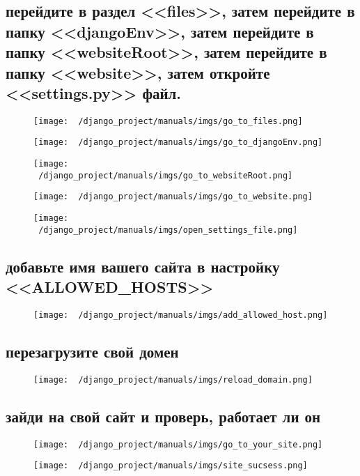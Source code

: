 \documentclass[12pt]{article}
\begin{document}
  \subsection{перейдите в раздел <<files>>, затем перейдите в папку <<djangoEnv>>, затем перейдите в папку <<websiteRoot>>, затем перейдите в папку <<website>>, затем откройте <<settings.py>> файл.}
	\begin{figure}[H]
		\centering
		\texttt{[image: ~/django\_project/manuals/imgs/go\_to\_files.png]}
		\caption{}
	\end{figure}
	\begin{figure}[H]
		\centering
		\texttt{[image: ~/django\_project/manuals/imgs/go\_to\_djangoEnv.png]}
		\caption{}
	\end{figure}
	\begin{figure}[H]
		\centering
		\texttt{[image: ~/django\_project/manuals/imgs/go\_to\_websiteRoot.png]}
		\caption{}
	\end{figure}
	\begin{figure}[H]
		\centering
		\texttt{[image: ~/django\_project/manuals/imgs/go\_to\_website.png]}
		\caption{}
	\end{figure}
	\begin{figure}[H]
		\centering
		\texttt{[image: ~/django\_project/manuals/imgs/open\_settings\_file.png]}
		\caption{}
	\end{figure}
  \subsection{добавьте имя вашего сайта в настройку <<ALLOWED\_HOSTS>>}
	\begin{figure}[H]
		\centering
		\texttt{[image: ~/django\_project/manuals/imgs/add\_allowed\_host.png]}
		\caption{}
	\end{figure}
  \subsection{перезагрузите свой домен}
	\begin{figure}[H]
		\centering
		\texttt{[image: ~/django\_project/manuals/imgs/reload\_domain.png]}
		\caption{}
	\end{figure}
  \subsection{зайди на свой сайт и проверь, работает ли он}
	\begin{figure}[H]
		\centering
		\texttt{[image: ~/django\_project/manuals/imgs/go\_to\_your\_site.png]}
		\caption{}
	\end{figure}
	\begin{figure}[H]
		\centering
		\texttt{[image: ~/django\_project/manuals/imgs/site\_sucsess.png]}
		\caption{}
	\end{figure}
\end{document}

